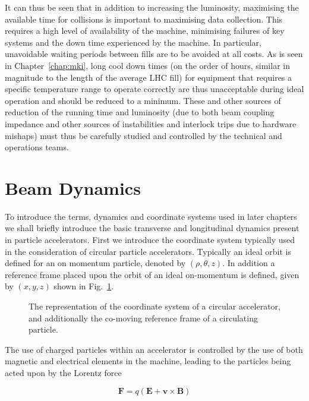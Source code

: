 It can thus be seen that in addition to increasing the luminosity, maximising the available time for collisions is important to maximising data collection. This requires a high level of availability of the machine, minimising failures of key systems and the down time experienced by the machine. In particular, unavoidable waiting periods between fills are to be avoided at all costs. As is seen in Chapter~\ref{chap:mki}, long cool down times (on the order of hours, similar in magnitude to the length of the average LHC fill) for equipment that requires a specific temperature range to operate correctly are thus unacceptable during ideal operation and should be reduced to a minimum. These and other sources of reduction of the running time and luminosity (due to both beam coupling impedance and other sources of instabilities and interlock trips due to hardware mishaps) must thus be carefully studied and controlled by the technical and operations teams.

\section{Beam Dynamics}

To introduce the terms, dynamics and coordinate systems used in later chapters we shall briefly introduce the basic transverse and longitudinal dynamics present in particle accelerators. First we introduce the coordinate system typically used in the consideration of circular particle accelerators. Typically an ideal orbit is defined for an on momentum particle, denoted by $(\rho, \theta, z)$. In addition a reference frame placed upon the orbit of an ideal on-momentum is defined, given by $(x, y, z)$ shown in Fig.~\ref{fig:accel-coord-system}. 

\begin{figure}
\label{fig:accel-coord-system}
\caption{The representation of the coordinate system of a circular accelerator, and additionally the co-moving reference frame of a circulating particle.}
\end{figure}

The use of charged particles within an accelerator is controlled by the use of both magnetic and electrical elements in the machine, leading to the particles being acted upon by the Lorentz force

\begin{equation}
\mathbf{F} = q \left( \mathbf{E} + \mathbf{v} \times \mathbf{B} \right)
\end{equation}


